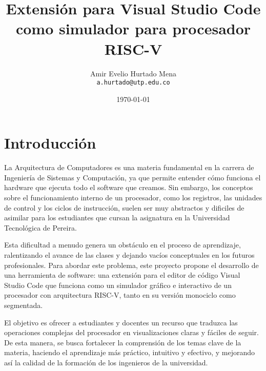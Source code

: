 \documentclass[12pt, letterpaper]{article} %
\title{Extensión para Visual Studio Code como simulador para procesador RISC-V}
\author{Amir Evelio Hurtado Mena \\ \texttt{a.hurtado@utp.edu.co}}
\date{\today} %
\begin{document}
\maketitle %

\newpage %

\tableofcontents %

\newpage 

\section{Introducción}

La Arquitectura de Computadores es una materia fundamental en la carrera de Ingeniería de Sistemas y Computación, ya que permite entender cómo funciona el hardware que ejecuta todo el software que creamos. Sin embargo, los conceptos sobre el funcionamiento interno de un procesador, como los registros, las unidades de control y los ciclos de instrucción, suelen ser muy abstractos y dificiles de asimilar para los estudiantes que cursan la asignatura en la Universidad Tecnológica de Pereira.

Esta dificultad a menudo genera un obstáculo en el proceso de aprendizaje, ralentizando el avance de las clases y dejando vacíos conceptuales en los futuros profesionales. Para abordar este problema, este proyecto propone el desarrollo de una herramienta de software: una extensión para el editor de código Visual Studio Code que funciona como un simulador gráfico e interactivo de un procesador con arquitectura RISC-V, tanto en su versión monociclo como segmentada.

El objetivo es ofrecer a estudiantes y docentes un recurso que traduzca las operaciones complejas del procesador en visualizaciones claras y fáciles de seguir. De esta manera, se busca fortalecer la comprensión de los temas clave de la materia, haciendo el aprendizaje más práctico, intuitivo y efectivo, y mejorando así la calidad de la formación de los ingenieros de la universidad.
\end{document}
